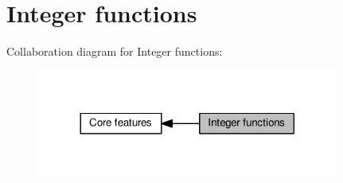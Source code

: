 \hypertarget{group__core__func__integer}{}\section{Integer functions}
\label{group__core__func__integer}
Collaboration diagram for Integer functions\+:
\nopagebreak
\begin{figure}[H]
\begin{center}
\leavevmode
\includegraphics[width=281pt]{d3/d3c/group__core__func__integer}
\end{center}
\end{figure}
